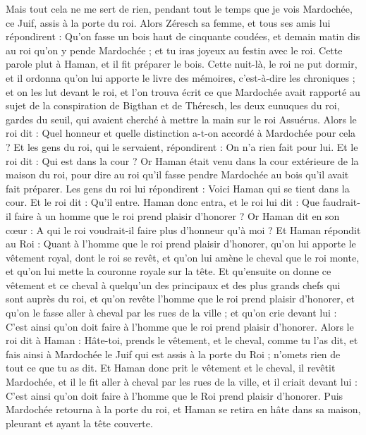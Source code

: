 \begin{multicols}{2}
Mais tout cela ne me sert de rien, pendant tout le temps que je vois Mardochée, ce Juif, assis à la porte du roi.
Alors Zéresch sa femme, et tous ses amis lui répondirent : Qu'on fasse un bois haut de cinquante coudées, et demain matin dis au roi qu'on y pende Mardochée ; et tu iras joyeux au festin avec le roi. Cette parole plut à Haman, et il fit préparer le bois.
\VerseOne{}Cette nuit-là, le roi ne put dormir, et il ordonna qu'on lui apporte le livre des mémoires, c'est-à-dire les chroniques ; et on les lut devant le roi,
et l’on trouva écrit ce que Mardochée avait rapporté au sujet de la conspiration de Bigthan et de Théresch, les deux eunuques du roi, gardes du seuil, qui avaient cherché à mettre la main sur le roi Assuérus.
Alors le roi dit : Quel honneur et quelle distinction a-t-on accordé à Mardochée pour cela ? Et les gens du roi, qui le servaient, répondirent : On n’a rien fait pour lui.
Et le roi dit : Qui est dans la cour ? Or Haman était venu dans la cour extérieure de la maison du roi, pour dire au roi qu'il fasse pendre Mardochée au bois qu'il avait fait préparer.
Les gens du roi lui répondirent : Voici Haman qui se tient dans la cour. Et le roi dit : Qu'il entre.
Haman donc entra, et le roi lui dit : Que faudrait-il faire à un homme que le roi prend plaisir d'honorer ? Or Haman dit en son cœur : A qui le roi voudrait-il faire plus d’honneur qu’à moi ?
Et Haman répondit au Roi : Quant à l’homme que le roi prend plaisir d’honorer,
qu’on lui apporte le vêtement royal, dont le roi se revêt, et qu'on lui amène le cheval que le roi monte, et qu'on lui mette la couronne royale sur la tête.
Et qu'ensuite on donne ce vêtement et ce cheval à quelqu'un des principaux et des plus grands chefs qui sont auprès du roi, et qu'on revête l'homme que le roi prend plaisir d'honorer, et qu'on le fasse aller à cheval par les rues de la ville ; et qu'on crie devant lui : C'est ainsi qu'on doit faire à l'homme que le roi prend plaisir d'honorer.
Alors le roi dit à Haman : Hâte-toi, prends le vêtement, et le cheval, comme tu l’as dit, et fais ainsi à Mardochée le Juif qui est assis à la porte du Roi ; n’omets rien de tout ce que tu as dit.
Et Haman donc prit le vêtement et le cheval, il revêtit Mardochée, et il le fit aller à cheval par les rues de la ville, et il criait devant lui : C’est ainsi qu’on doit faire à l’homme que le Roi prend plaisir d’honorer.
Puis Mardochée retourna à la porte du roi, et Haman se retira en hâte dans sa maison, pleurant et ayant la tête couverte.

\end{multicols}
